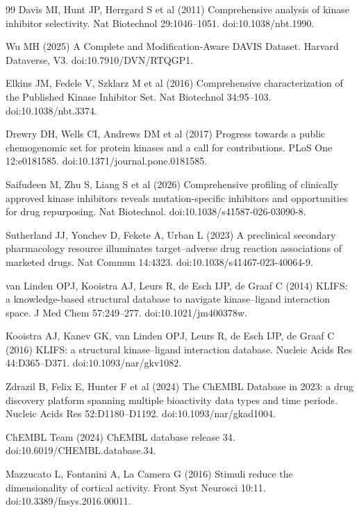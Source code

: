 \documentclass[11pt]{article}
\begin{document}
\begin{thebibliography}{99}
 Davis MI, Hunt JP, Herrgard S et al (2011) Comprehensive analysis of
kinase inhibitor selectivity. Nat Biotechnol 29:1046--1051. doi:10.1038/nbt.1990.

 Wu MH (2025) A Complete and Modification-Aware DAVIS Dataset.
Harvard Dataverse, V3. doi:10.7910/DVN/RTQGP1.

 Elkins JM, Fedele V, Szklarz M et al (2016) Comprehensive
characterization of the Published Kinase Inhibitor Set. Nat Biotechnol 34:95--103.
doi:10.1038/nbt.3374.

 Drewry DH, Wells CI, Andrews DM et al (2017) Progress towards a
public chemogenomic set for protein kinases and a call for contributions. PLoS One
12:e0181585. doi:10.1371/journal.pone.0181585.

 Saifudeen M, Zhu S, Liang S et al (2026) Comprehensive profiling
of clinically approved kinase inhibitors reveals mutation-specific inhibitors and
opportunities for drug repurposing. Nat Biotechnol. doi:10.1038/s41587-026-03090-8.

 Sutherland JJ, Yonchev D, Fekete A, Urban L (2023) A preclinical
secondary pharmacology resource illuminates target--adverse drug reaction associations of
marketed drugs. Nat Commun 14:4323. doi:10.1038/s41467-023-40064-9.

 van Linden OPJ, Kooistra AJ, Leurs R, de Esch IJP, de Graaf C
(2014) KLIFS: a knowledge-based structural database to navigate kinase--ligand interaction
space. J Med Chem 57:249--277. doi:10.1021/jm400378w.

 Kooistra AJ, Kanev GK, van Linden OPJ, Leurs R, de Esch IJP,
de Graaf C (2016) KLIFS: a structural kinase--ligand interaction database. Nucleic Acids
Res 44:D365--D371. doi:10.1093/nar/gkv1082.

 Zdrazil B, Felix E, Hunter F et al (2024) The ChEMBL Database in
2023: a drug discovery platform spanning multiple bioactivity data types and time periods.
Nucleic Acids Res 52:D1180--D1192. doi:10.1093/nar/gkad1004.

 ChEMBL Team (2024) ChEMBL database release 34.
doi:10.6019/CHEMBL.database.34.

 Mazzucato L, Fontanini A, La Camera G (2016) Stimuli reduce the
dimensionality of cortical activity. Front Syst Neurosci 10:11.
doi:10.3389/fnsys.2016.00011.


\end{thebibliography}
\end{document}
